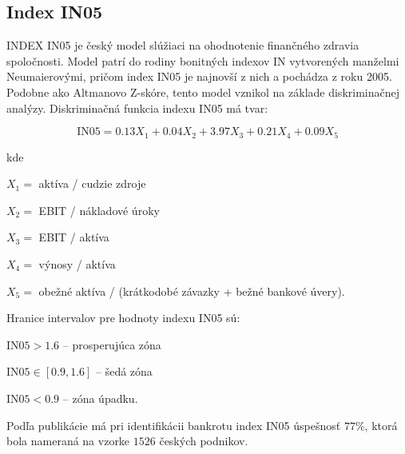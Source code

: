 \subsection{Index IN05}

INDEX IN05 je český model slúžiaci na ohodnotenie finančného zdravia spoločnosti.
Model patrí do rodiny bonitných indexov IN vytvorených manželmi Neumaierovými, pričom index IN05 je najnovší z nich a pochádza z roku 2005.
Podobne ako Altmanovo Z-skóre, tento model vznikol na základe diskriminačnej analýzy. Diskriminačná funkcia indexu IN05 má tvar:

\[
    \text{IN05} = 0.13X_1 + 0.04X_2 + 3.97X_3 + 0.21X_4 + 0.09X_5
\]

kde

\(X_1 = \) aktíva / cudzie zdroje

\(X_2 = \) EBIT / nákladové úroky

\(X_3 = \) EBIT / aktíva

\(X_4 = \) výnosy / aktíva

\(X_5 = \) obežné aktíva / (krátkodobé závazky + bežné bankové úvery).

Hranice intervalov pre hodnoty indexu IN05 sú:

\( \text{IN05} > 1.6\) – prosperujúca zóna

\( \text{IN05} \in [0.9, 1.6]\) – šedá zóna

\( \text{IN05} < 0.9 \) – zóna úpadku.

Podľa publikácie \cite{sav} má pri identifikácii bankrotu index IN05 úspešnosť \(77 \%\), ktorá bola nameraná na vzorke \( 1526 \) českých podnikov.

